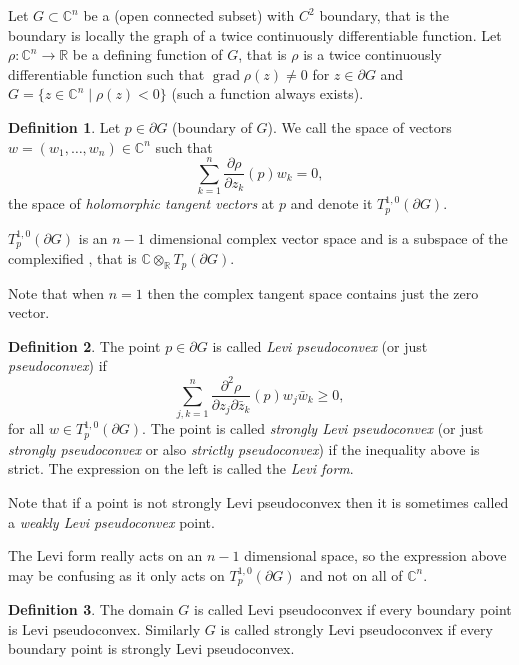 \documentclass[12pt]{article}
\theoremstyle{theorem}
\theoremstyle{definition}
\newtheorem*{defn}{Definition}
\begin{document}
Let $G \subset {\mathbb{C}}^n$ be a  (open connected subset) with $C^2$
boundary, that is the boundary is locally the graph of a twice continuously
differentiable function.  Let $\rho \colon {\mathbb{C}}^n \to {\mathbb{R}}$
be a defining function of $G$,
that is $\rho$ is a twice continuously differentiable function such that
$\operatorname{grad} \rho (z) \not= 0$ for $z \in \partial G$ and $G =
\{ z \in {\mathbb{C}}^n \mid \rho(z) < 0 \}$ (such a function always exists).

\begin{defn}
Let $p \in \partial G$ (boundary of $G$).
We call the space of vectors $w = (w_1,\ldots,w_n) \in {\mathbb{C}}^n$
such that
\begin{equation*}
\sum_{k=1}^n \frac{\partial \rho}{\partial z_k} (p) w_k = 0 ,
\end{equation*}
the space of {\em holomorphic tangent vectors}
at $p$ and denote it
$T^{1,0}_p(\partial G)$.
\end{defn}

$T^{1,0}_p(\partial G)$ is an $n-1$ dimensional complex vector space
and is a subspace of the complexified , that is ${\mathbb{C}} \otimes_{\mathbb{R}} T_p(\partial G)$.

Note that when $n=1$ then the complex
tangent space contains just the zero vector.

\begin{defn}
The point $p \in \partial G$
is called {\em Levi pseudoconvex} (or just {\em pseudoconvex})
if
\begin{equation*}
\sum_{j,k=1}^n
\frac{\partial^2 \rho}{\partial z_j \partial \bar{z}_k} (p) w_j \bar{w}_k
\geq 0 ,
\end{equation*}
for all $w \in T^{1,0}_p(\partial G)$.  The point is
called {\em strongly Levi pseudoconvex} (or just {\em strongly pseudoconvex} or also {\em strictly pseudoconvex})
if the inequality above is strict.  The expression on the left is
called the {\em Levi form}.
\end{defn}

Note that if a point is not strongly Levi pseudoconvex then it is sometimes called a {\em weakly Levi pseudoconvex} point.

The Levi form really acts on an $n-1$ dimensional space, so the expression above may be confusing as it only acts on $T^{1,0}_p(\partial G)$ and not on all
of ${\mathbb{C}}^n$.

\begin{defn}
The domain $G$
is called Levi pseudoconvex
if every boundary point is
Levi pseudoconvex.  Similarly
$G$ is called strongly Levi pseudoconvex
if every boundary point is
strongly Levi pseudoconvex.
\end{defn}
\end{document}
